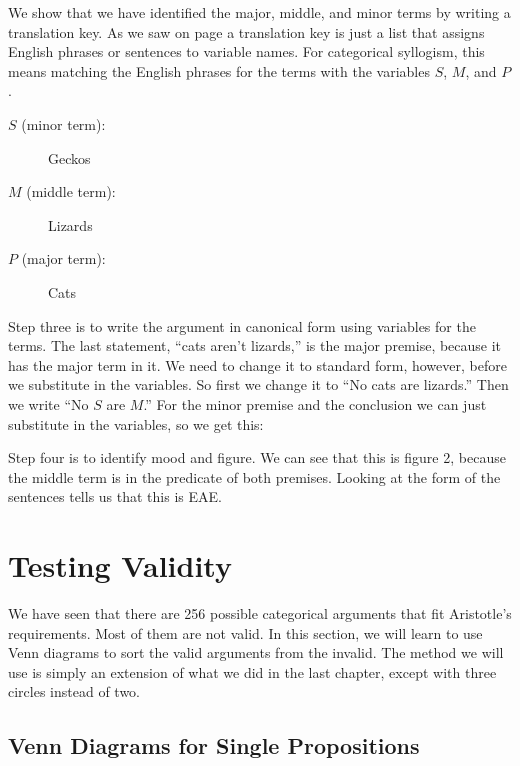 We show that we have identified the major, middle, and minor terms by writing a \gls{translation key}\label{def:translation_key}. As we saw on page \pageref{def:translation_key} a translation key is just a list that assigns English phrases or sentences to variable names. For categorical syllogism, this means matching the English phrases for the terms with the variables $S$, $M$, and $P$.

\begin{description}
\item[$S$ (minor term):] Geckos
\item[$M$ (middle term):] Lizards
\item[$P$ (major term):] Cats
\end{description}

Step three is to write the argument in canonical form using variables for the terms. The last statement, ``cats aren't lizards,'' is the major premise, because it has the major term in it. We need to change it to standard form, however, before we substitute in the variables. So first we change it to ``No cats are lizards.'' Then we write ``No $S$ are $M$.'' For the minor premise and the conclusion we can just substitute in the variables, so we get this:

\begin{kormanize}
\end{kormanize}

Step four is to identify mood and figure. We can see that this is figure 2, because the middle term is in the predicate of both premises. Looking at the form of the sentences tells us that this is EAE.

\section{Testing Validity}\label{sec:testing_validity}

We have seen that there are 256 possible categorical arguments that fit Aristotle's requirements. Most of them are not valid. In this section, we will learn to use Venn diagrams to sort the valid arguments from the invalid. The method we will use is simply an extension of what we did in the last chapter, except with three circles instead of two.

\subsection{Venn Diagrams for Single Propositions}

